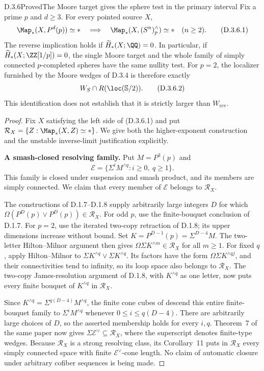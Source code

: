 \begin{claim}{D.3.6}{Proved}{The Moore target gives the sphere test in the primary interval}
Fix a prime $p$ and $d\geq3$. For every pointed source $X$,
\[
 \Map_*(X,P^d(p))\simeq *
 \quad\Longrightarrow\quad
 \Map_*(X,(S^n)^{\wedge}_p)\simeq *
                       \quad(n\geq2).
 \tag{D.3.6.1}
\]
The reverse implication holds if
$\widetilde H_*(X;\QQ)=0$. In particular, if
$\widetilde H_*(X;\ZZ[1/p])=0$, the single Moore target and
the whole family of simply connected $p$-completed spheres
have the same nullity test. For $p=2$, the localizer furnished
by the Moore wedges of D.3.4 is therefore exactly
\[
                 W_S\cap R(\loc(\mathbb S/2)).
 \tag{D.3.6.2}
\]
This identification does not establish that it is strictly
larger than $W_{\mathrm{rev}}$.
\end{claim}
\begin{proof}
Fix $X$ satisfying the left side of (D.3.6.1) and put
$\mathcal R_X=\{Z:\Map_*(X,Z)\simeq *\}$.
We give both the higher-exponent construction and the
unstable inverse-limit justification explicitly.

\medskip\noindent
\textbf{A smash-closed resolving family.}
Put $M=P^3(p)$ and
\[
 \mathcal E=\{\Sigma^i M^{\wedge q}:i\geq0,\ q\geq1\}.
\]
This family is closed under suspension and smash product,
and its members are simply connected. We claim that every
member of $\mathcal E$ belongs to $\mathcal R_X$.

The constructions of D.1.7--D.1.8 supply arbitrarily large
integers $D$ for which
$\Omega(P^D(p)\vee P^D(p))\in\mathcal R_X$.
For odd $p$, use the finite-bouquet conclusion of D.1.7.
For $p=2$, use the iterated two-copy retraction of D.1.8;
its upper dimensions increase without bound.
Set $K=P^{D-1}(p)=\Sigma^{D-4}M$. The two-letter
Hilton--Milnor argument then gives
$\Omega\Sigma K^{\wedge m}\in\mathcal R_X$ for all $m\geq1$.
For fixed $q$, apply Hilton--Milnor to
$\Sigma K^{\wedge q}\vee\Sigma K^{\wedge q}$.
Its factors have the form $\Omega\Sigma K^{\wedge qj}$,
and their connectivities tend to infinity, so its loop space
also belongs to $\mathcal R_X$. The two-copy
James-resolution argument of D.1.8, with $K^{\wedge q}$ as
one letter, now puts every finite bouquet of $K^{\wedge q}$
in $\mathcal R_X$.

Since
$K^{\wedge q}=\Sigma^{q(D-4)}M^{\wedge q}$,
the finite cone cubes of \cite[Theorem~8]{I_Strom2012}
descend this entire finite-bouquet family to
$\Sigma^iM^{\wedge q}$ whenever $0\leq i\leq q(D-4)$.
There are arbitrarily large choices of $D$, so the asserted
membership holds for every $i,q$.
Theorem~7 of the same paper now gives
$\Sigma\mathcal E^\vee\subseteq\mathcal R_X$, where the
superscript denotes finite-type wedges. Because
$\mathcal R_X$ is a strong resolving class, its Corollary~11
puts in $\mathcal R_X$ every simply connected space with
finite $\mathcal E^\vee$-cone length. No claim of automatic
closure under arbitrary cofiber sequences is being made.


\end{proof}

